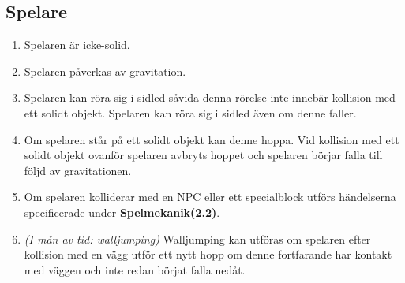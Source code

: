 \documentclass{TDP003mall}
\begin{document}
\subsection{Spelare}
\begin{enumerate}
\item Spelaren är icke-solid.

\item Spelaren påverkas av gravitation.

\item Spelaren kan röra sig i sidled såvida denna rörelse inte innebär kollision med ett solidt objekt. Spelaren kan röra sig i sidled även om denne faller.

\item Om spelaren står på ett solidt objekt kan denne hoppa. Vid kollision med ett solidt objekt ovanför spelaren avbryts hoppet och spelaren börjar falla till följd av gravitationen.

\item Om spelaren kolliderar med en NPC eller ett specialblock utförs händelserna specificerade under \textbf{Spelmekanik(2.2)}.

\item \noindent\textit{(I mån av tid: walljumping)} Walljumping kan utföras om spelaren efter kollision med en vägg utför ett nytt hopp om denne fortfarande har kontakt med väggen och inte redan börjat falla nedåt.

\newpage


\end{enumerate}
\end{document}
